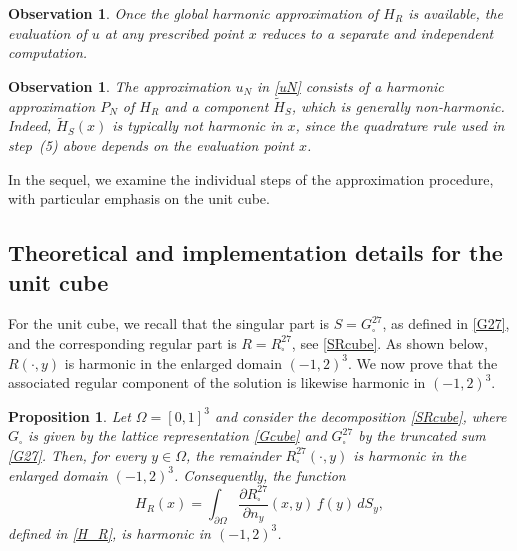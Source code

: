 \documentclass[12pt,oneside,reqno]{amsart}%
\theoremstyle{plain}
\newtheorem{proposition}[theorem]{Proposition}
\newtheorem{observation}[theorem]{Observation}
\numberwithin{equation}{section}
\begin{document}
\begin{observation}
Once the global harmonic approximation of $H_R$ is available, 
the evaluation of $u$ at any prescribed point $x$ 
reduces to a separate and independent computation.
\end{observation}

\begin{observation}
The approximation $u_N$ in \eqref{uN} consists of a harmonic
approximation $P_N$ of $H_R$ and a component $\tilde H_S$,
which is generally non-harmonic. Indeed, $\tilde H_S(x)$ is
typically not harmonic in $x$, since the quadrature rule
used in step~(5) above depends on the evaluation point $x$.
\end{observation}

 
In the sequel, we examine the individual steps of the approximation
procedure, with particular emphasis on the unit cube.

\subsection{Theoretical and implementation details for the unit cube}\hfill

For the unit cube, we recall that the singular part is 
$S = G_{\square}^{27}$, as defined in \eqref{G27}, 
and the corresponding regular part is 
$R = R_{\square}^{27}$, see \eqref{SRcube}. 
As shown below, $R(\cdot,y)$ is harmonic in the enlarged domain 
$(-1,2)^3$. 
We now prove that the associated regular component of the solution 
is likewise harmonic in $(-1,2)^3$.

\begin{proposition}
Let $\Omega=[0,1]^3$ and consider the decomposition
\eqref{SRcube}, where $G_{\square}$ is given by the lattice
representation \eqref{Gcube} and $G_{\square}^{27}$ by the
truncated sum \eqref{G27}.  
Then, for every $y\in\Omega$, the remainder
$R_{\square}^{27}(\cdot,y)$ is harmonic in the enlarged domain
$(-1,2)^3$.  Consequently, the function
\[
H_R(x)=\int_{\partial\Omega}
\frac{\partial R_{\square}^{27}}{\partial n_y}(x,y)\,
f(y)\,dS_y,
\]
defined in \eqref{H_R}, is harmonic in $(-1,2)^3$.
\end{proposition}
\end{document}
